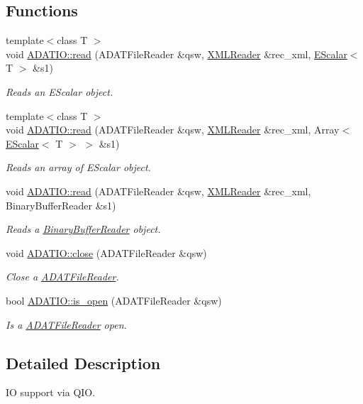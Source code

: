 \subsection*{Functions}
\begin{DoxyCompactItemize}
\item 
{\footnotesize template$<$class T $>$ }\\void \mbox{\hyperlink{group__qio_ga3dd8ea4aebc2b69c0ad2996743816341}{A\+D\+A\+T\+I\+O\+::read}} (A\+D\+A\+T\+File\+Reader \&qsw, \mbox{\hyperlink{classADATXML_1_1XMLReader}{X\+M\+L\+Reader}} \&rec\+\_\+xml, \mbox{\hyperlink{classENSEM_1_1EScalar}{E\+Scalar}}$<$ T $>$ \&s1)
\begin{DoxyCompactList}\small\item\em Reads an E\+Scalar object. \end{DoxyCompactList}\item 
{\footnotesize template$<$class T $>$ }\\void \mbox{\hyperlink{group__qio_ga2505d6fa25fdce3f9d953179afc3532e}{A\+D\+A\+T\+I\+O\+::read}} (A\+D\+A\+T\+File\+Reader \&qsw, \mbox{\hyperlink{classADATXML_1_1XMLReader}{X\+M\+L\+Reader}} \&rec\+\_\+xml, Array$<$ \mbox{\hyperlink{classENSEM_1_1EScalar}{E\+Scalar}}$<$ T $>$ $>$ \&s1)
\begin{DoxyCompactList}\small\item\em Reads an array of E\+Scalar object. \end{DoxyCompactList}\item 
void \mbox{\hyperlink{group__qio_gad349a61627372c07f82a004b876423b8}{A\+D\+A\+T\+I\+O\+::read}} (A\+D\+A\+T\+File\+Reader \&qsw, \mbox{\hyperlink{classADATXML_1_1XMLReader}{X\+M\+L\+Reader}} \&rec\+\_\+xml, Binary\+Buffer\+Reader \&s1)
\begin{DoxyCompactList}\small\item\em Reads a \mbox{\hyperlink{classADATIO_1_1BinaryBufferReader}{Binary\+Buffer\+Reader}} object. \end{DoxyCompactList}\item 
void \mbox{\hyperlink{group__qio_gac32c771b58d87e4ef4af62a7ad2e5c0d}{A\+D\+A\+T\+I\+O\+::close}} (A\+D\+A\+T\+File\+Reader \&qsw)
\begin{DoxyCompactList}\small\item\em Close a \mbox{\hyperlink{classADATIO_1_1ADATFileReader}{A\+D\+A\+T\+File\+Reader}}. \end{DoxyCompactList}\item 
bool \mbox{\hyperlink{group__qio_gad9b8cab72f011dd46c24a51e8a1c756a}{A\+D\+A\+T\+I\+O\+::is\+\_\+open}} (A\+D\+A\+T\+File\+Reader \&qsw)
\begin{DoxyCompactList}\small\item\em Is a \mbox{\hyperlink{classADATIO_1_1ADATFileReader}{A\+D\+A\+T\+File\+Reader}} open. \end{DoxyCompactList}\end{DoxyCompactItemize}


\subsection{Detailed Description}
IO support via Q\+IO. 

